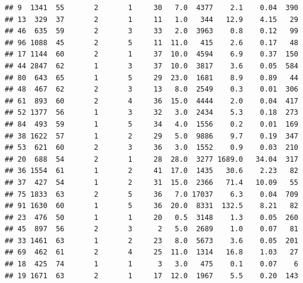 \documentclass[
]{article}
\begin{document}
\begin{verbatim}
## 9  1341  55       2       1     30   7.0  4377    2.1    0.04  390
## 13  329  37       2       1     11   1.0   344   12.9    4.15   29
## 46  635  59       2       3     33   2.0  3963    0.8    0.12   99
## 96 1088  45       2       5     11  11.0   415    2.6    0.17   48
## 17 1144  60       2       1     37  10.0  4594    6.9    0.37  150
## 44 2847  62       1       3     37  10.0  3817    3.6    0.05  584
## 80  643  65       1       5     29  23.0  1681    8.9    0.89   44
## 48  467  62       2       3     13   8.0  2549    0.3    0.01  306
## 61  893  60       2       4     36  15.0  4444    2.0    0.04  417
## 52 1377  56       1       3     32   3.0  2434    5.3    0.18  273
## 84  493  59       1       5     34   4.0  1556    0.2    0.01  169
## 38 1622  57       1       2     29   5.0  9886    9.7    0.19  347
## 53  621  60       2       3     36   3.0  1552    0.9    0.03  210
## 20  688  54       2       1     28  28.0  3277 1689.0   34.04  317
## 36 1554  61       1       2     41  17.0  1435   30.6    2.23   82
## 37  427  54       1       2     31  15.0  2366   71.4   10.09   55
## 75 1833  63       2       5     36   7.0 17037    6.3    0.04  709
## 91 1630  60       1       5     36  20.0  8331  132.5    8.21   82
## 23  476  50       1       1     20   0.5  3148    1.3    0.05  260
## 45  897  56       2       3      2   5.0  2689    1.0    0.07   81
## 33 1461  63       1       2     23   8.0  5673    3.6    0.05  201
## 69  462  61       2       4     25  11.0  1314   16.8    1.03   27
## 18  425  74       1       1      3   3.0   475    0.1    0.07    6
## 19 1671  63       2       1     17  12.0  1967    5.5    0.20  143
\end{verbatim}
\end{document}
